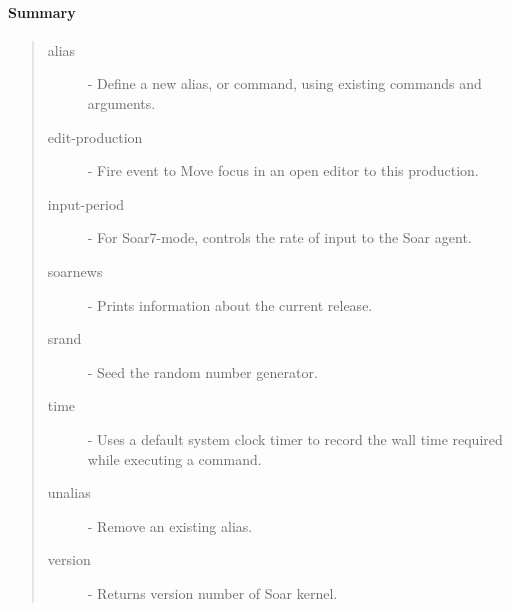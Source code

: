 \paragraph{Summary}
\begin{quote}
\begin{description}
\item[alias] - Define a new alias, or command, using existing commands and arguments. 
\item[edit-production] - Fire event to Move focus in an open editor to this production.
\item[input-period] -  For Soar7-mode, controls the rate of input to the Soar agent.
\item[soarnews] - Prints information about the current release.
\item[srand] -  Seed the random number generator.
\item[time] - Uses a default system clock timer to record the wall time required while executing a command.
\item[unalias] - Remove an existing alias.
\item[version] - Returns version number of Soar kernel.
\end{description}
\end{quote}












